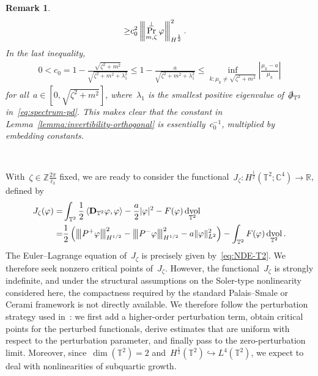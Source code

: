 \documentclass[11pt,final]{amsart}
\newcommand{\tnorm}[1]{%
  \left\vert\kern-0.3ex\left\vert\kern-0.3ex\left\vert #1 \right\vert\kern-0.3ex\right\vert\kern-0.3ex\right\vert
}
\newcommand{\R}{\mathbb{R}}
\newcommand{\C}{\mathbb{C}}
\newcommand{\T}{\mathbb{T}}
\newcommand{\pd}{\slashed{\partial}}
\newcommand{\dd}{\mathop{}\!\mathrm{d}}
\newcommand{\pD}{\mathbf{D}}
\newcommand{\Abracket}[1]{\left<#1\right>} %
\newcommand{\parenthesis}[1]{\left(#1\right)} %
\newcommand{\bZ}{\mathbb{Z}}
\DeclareMathOperator{\dv}{\dd{vol}}
\DeclareMathOperator{\proj}{Pr}
\newtheorem{rmk}[thm]{Remark}
\begin{document}
\begin{rmk}
\begin{align}
        \geq& c_0^2 \tnorm{\proj_{m,\zeta}^\perp \varphi }_{H^{\frac{1}{2}}}^2.
    \end{align}
    In the last inequality, 
    \begin{align}
        0<c_0=1-\frac{\sqrt{\zeta^2+m^2}}{\sqrt{\zeta^2+m^2+\lambda_1^2}} 
        \leq 1-\frac{a}{\sqrt{\zeta^2+m^2+\lambda_1^2}}
        \leq \inf_{k\colon \mu_k\neq\sqrt{\zeta^2+m^2}} \left|\frac{\mu_k-a}{\mu_k}\right| 
    \end{align}
    for all~$a\in [0,\sqrt{\zeta^2+m^2}]$, where~$\lambda_1$ is the smallest positive eigenvalue of~$\pd_{\T^2}$ in~\eqref{eq:spectrum-pd}.
    This makes clear that the constant in Lemma~\ref{lemma:invertibility-orthogonal} is essentially~$c_0^{-1}$, multiplied by embedding constants.
\end{rmk}


\

With~$\zeta\in\bZ\frac{2\pi}{\ell_3}$ fixed, we are ready to consider the functional~$J_{\zeta}\colon H^{\frac{1}{2}}(\mathbb{T}^2;\C^4)\to \R$, defined by 
\begin{align}\label{eq:functional-T2}
    J_\zeta (\varphi)
    =&\int_{\T^2} \frac{1}{2}\Abracket{\pD_{\T^2} \varphi,\varphi }
     -\frac{a}{2}|\varphi|^2 -F(\varphi)\dv_{\T^2}
    \\
    =&\frac{1}{2}\parenthesis{ \tnorm{P^+\varphi}_{H^{1/2}}^2 
     - \tnorm{P^-\varphi }_{H^{1/2}}^2 
     -a\|\varphi\|_{L^2}^2 }
     -\int_{\T^2} F(\varphi)\dv_{\T^2}.
\end{align}
The Euler--Lagrange equation of~$J_\zeta$ is precisely given by~\eqref{eq:NDE-T2}.
We therefore seek nonzero critical points of~$J_{\zeta}$. 
However, the functional~$J_\zeta$ is strongly indefinite, and under the structural assumptions on the Soler-type nonlinearity considered here, the compactness required by the standard Palais--Smale or Cerami framework is not directly available. 
We therefore follow the perturbation strategy used in~\cite{WZ2026Stationary}: we first add a higher-order perturbation term, obtain critical points for the perturbed functionals, derive estimates that are uniform with respect to the perturbation parameter, and finally pass to the zero-perturbation limit.
Moreover, since~$\dim (\mathbb{T}^2)=2$ and~$H^{\frac{1}{2}}(\T^2)\hookrightarrow L^4(\T^2)$, we expect to deal with nonlinearities of subquartic growth. 
\end{document}
